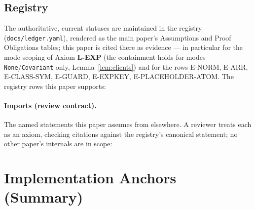 \documentclass[11pt]{article}
\begin{document}
\subsection{Registry}

The authoritative, current statuses are maintained in the registry
(\texttt{docs/ledger.yaml}), rendered as the main paper's Assumptions and
Proof Obligations tables; this paper is cited there as evidence — in
particular for the mode scoping of Axiom \textbf{L-EXP} (the containment
holds for modes \texttt{None}/\texttt{Covariant} only,
Lemma~\ref{lem:clients}) and for the rows E-NORM, E-ARR, E-CLASS-SYM,
E-GUARD, E-EXPKEY, E-PLACEHOLDER-ATOM. The registry rows this paper
supports:



\paragraph{Imports (review contract).}
The named statements this paper assumes from elsewhere. A reviewer treats
each as an axiom, checking citations against the registry's canonical
statement; no other paper's internals are in scope:



\section*{Implementation Anchors (Summary)}
\end{document}
